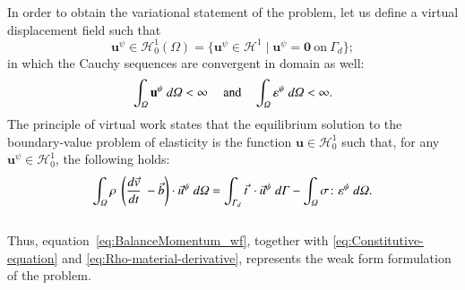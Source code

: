 \documentclass[preprint,12pt,a4paper]{elsarticle}
\newcommand{\vect}[1]{
  \ensuremath{\mathbf{{#1}}}
}
\newcommand{\tens}[1]{
  \ensuremath{\mathbf{{#1}}}
}
\newcommand{\Integral}[2]{
  \IfStrEqCase{#1}{
    {2}{\ensuremath{\int_{\varGamma_d}{#2}\ d\varGamma}}
    {3}{\ensuremath{\int_{\varOmega}{#2}\ d\varOmega}}
  }
}
\begin{document}
In order to obtain the variational statement of the problem, let us define a
virtual displacement field such that
\begin{equation}
  \label{eq:Hilbert-space}
  \vect{u}^{\psi} \in \mathcal{H}^1_0(\Omega) = \{ \vect{u}^{\psi} \in
  \mathcal{H}^1 \mid \vect{u}^{\psi} = \vect{0}\ \text{on}\ \Gamma_d \};
\end{equation}
in which the Cauchy sequences are convergent in \gls{domain} as well:
\begin{equation}
  \label{eq:cauchy-secuence}
  \Integral{3}{\vect{u}^{\psi}} < \infty\ \quad\text{and}\quad
  \Integral{3}{\tens{\varepsilon}^{\psi}} < \infty.
\end{equation}
The principle of virtual work states that the equilibrium solution to
the boundary-value problem of elasticity is the function $\vect{u} \in
\mathcal{H}^1_0$ such that, for any $\vect{u}^{\psi} \in
\mathcal{H}^1_0$,
the following holds:
\begin{equation}
  \label{eq:BalanceMomentum_wf}
  \Integral{3}{\rho\ \left( \frac{d\vec{v}}{dt}\ - \vec{b} \right) \cdot \vec{u}^{\psi}} =
  \Integral{2}{\vec{t}\ \cdot \vec{u}^{\psi}} - \Integral{3}{\tens{\sigma} \colon
   \tens{\varepsilon}^{\psi}}.
\end{equation}\\
Thus, equation~\eqref{eq:BalanceMomentum_wf}, together with
\eqref{eq:Constitutive-equation} and
\eqref{eq:Rho-material-derivative}, represents the weak form
formulation of the problem.
\end{document}

